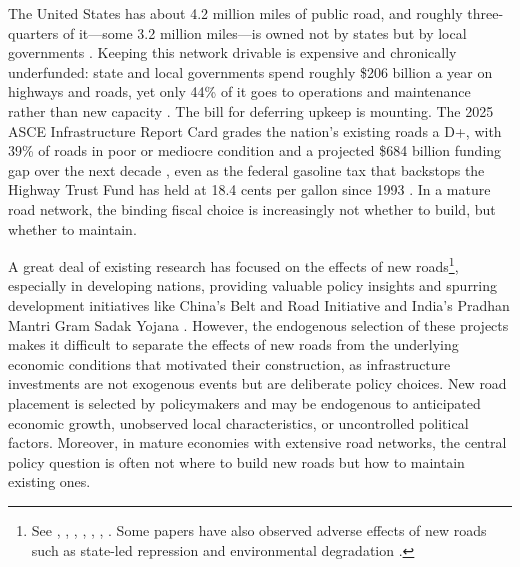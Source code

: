 ﻿The United States has about 4.2 million miles of public road, and roughly three-quarters of it---some 3.2 million miles---is owned not by states but by local governments \citep{fhwa2022}. Keeping this network drivable is expensive and chronically underfunded: state and local governments spend roughly \$206 billion a year on highways and roads, yet only 44\% of it goes to operations and maintenance rather than new capacity \citep{urban2021highway}. The bill for deferring upkeep is mounting. The 2025 ASCE Infrastructure Report Card grades the nation's existing roads a D+, with 39\% of roads in poor or mediocre condition and a projected \$684 billion funding gap over the next decade \citep{asce2025}, even as the federal gasoline tax that backstops the Highway Trust Fund has held at 18.4 cents per gallon since 1993 \citep{pgpf_htf_explained}. In a mature road network, the binding fiscal choice is increasingly not whether to build, but whether to maintain.

A great deal of existing research has focused on the effects of new roads\footnote{See \cite{ghani2016highway}, \cite{beenstock2016hedonic}, \cite{levkovich2016effects}, \cite{hoogendoorn2019house}, \cite{theisen2021road}, \cite{gibbons2019new}, \cite{fretz2022highways}. Some papers have also observed adverse effects of new roads such as state-led repression \citep{gonzalez2025} and environmental degradation \citep{asher2020eco}.}, especially in developing nations, providing valuable policy insights and spurring development initiatives like China's Belt and Road Initiative \citep{huang2016understanding} and India's Pradhan Mantri Gram Sadak Yojana \citep{asher2020}. However, the endogenous selection of these projects makes it difficult to separate the effects of new roads from the underlying economic conditions that motivated their construction, as infrastructure investments are not exogenous events but are deliberate policy choices. New road placement is selected by policymakers and may be endogenous to anticipated economic growth, unobserved local characteristics, or uncontrolled political factors. Moreover, in mature economies with extensive road networks, the central policy question is often not where to build new roads but how to maintain existing ones.








